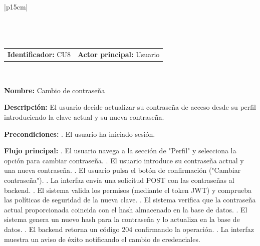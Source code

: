 \begingroup
{}
\setlength{\arrayrulewidth}{1pt}
\begin{longtable}{|p{15cm}|}
  \hline
   \\
  \hline
  \endfirsthead
   \\
  \hline
   \\
  \hline
  \endhead
  \hline {} \\ \hline
  \endfoot
  \hline
  \caption{Caso de uso 8 — Cambio de contraseña.}
  \label{TB:CU8_PERFIL_PASSWORD}
  \endlastfoot

  \begin{tabularx}{\linewidth}{@{}X X@{}}
    \textbf{Identificador:} CU8 & \textbf{Actor principal:} Usuario
  \end{tabularx} \\ \hline

  \textbf{Nombre:} Cambio de contraseña \\ \hline

  \textbf{Descripción:} \newline 
  El usuario decide actualizar su contraseña de acceso desde su perfil introduciendo la clave actual y su nueva contraseña. \\ \hline

  \textbf{Precondiciones:} . El usuario ha iniciado sesión. \\ \hline

  \textbf{Flujo principal:} . El usuario navega a la sección de "Perfil" y selecciona la opción para cambiar contraseña. . El usuario introduce su contraseña actual y una nueva contraseña. . El usuario pulsa el botón de confirmación ("Cambiar contraseña"). . La interfaz envía una solicitud POST con las contraseñas al backend. . El sistema valida los permisos (mediante el token JWT) y comprueba las políticas de seguridad de la nueva clave. . El sistema verifica que la contraseña actual proporcionada coincida con el hash almacenado en la base de datos. . El sistema genera un nuevo hash para la contraseña y lo actualiza en la base de datos. . El backend retorna un código 204 confirmando la operación. . La interfaz muestra un aviso de éxito notificando el cambio de credenciales. \\ \hline


\end{longtable}
